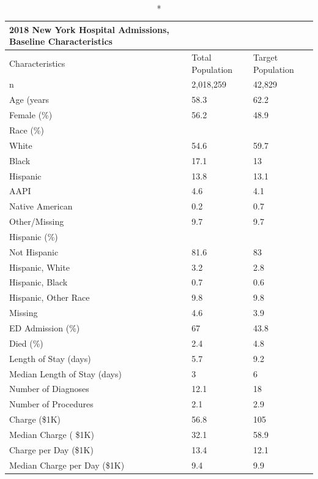 \documentclass[preprint, 3p,
authoryear]{elsarticle} %
\begin{document}
\captionsetup[table]{labelformat=empty,skip=1pt}
\begin{longtable}{lll}
\caption*{
{\large 2018 New York Hospital Admissions, Baseline Characteristics}
} \\ 
\toprule
Characteristics & Total Population & Target Population \\ 
\midrule
n & 2,018,259 & 42,829 \\ 
Age (years & 58.3 & 62.2 \\ 
Female (\%) & 56.2 & 48.9 \\ 
Race (\%) &   &   \\ 
White & 54.6 & 59.7 \\ 
Black & 17.1 & 13 \\ 
Hispanic & 13.8 & 13.1 \\ 
AAPI & 4.6 & 4.1 \\ 
Native American & 0.2 & 0.7 \\ 
Other/Missing & 9.7 & 9.7 \\ 
Hispanic (\%) &   &   \\ 
Not Hispanic & 81.6 & 83 \\ 
Hispanic, White & 3.2 & 2.8 \\ 
Hispanic, Black & 0.7 & 0.6 \\ 
Hispanic, Other Race & 9.8 & 9.8 \\ 
Missing & 4.6 & 3.9 \\ 
ED Admission (\%) & 67 & 43.8 \\ 
Died (\%) & 2.4 & 4.8 \\ 
Length of Stay (days) & 5.7 & 9.2 \\ 
Median Length of Stay (days) & 3 & 6 \\ 
Number of Diagnoses & 12.1 & 18 \\ 
Number of Procedures & 2.1 & 2.9 \\ 
Charge (\$1K) & 56.8 & 105 \\ 
Median Charge ( \$1K) & 32.1 & 58.9 \\ 
Charge per Day (\$1K) & 13.4 & 12.1 \\ 
Median Charge per Day (\$1K) & 9.4 & 9.9 \\ 
\bottomrule
\end{longtable}
\end{document}
